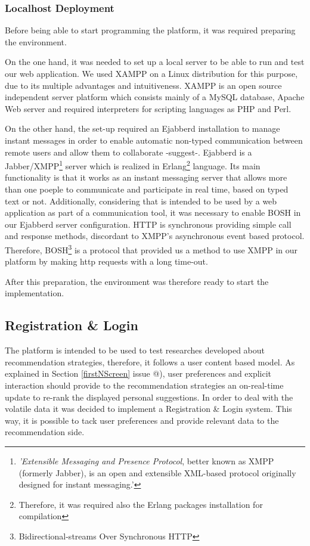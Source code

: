 \documentclass{acm_proc_article-sp}
\makeatletter
\newcommand*{\rom}[1]{\expandafter\@slowromancap\romannumeral #1@}
\makeatother
\begin{document}
\subsubsection{Localhost Deployment}

Before being able to start programming the platform, it was required preparing the environment. 

On the one hand, it was needed to set up a local server to be able to run and test our web application. We used XAMPP on a Linux distribution for this purpose, due to its multiple advantages and intuitiveness. XAMPP is an open source independent server platform which consists mainly of a MySQL database, Apache Web server and required interpreters for scripting languages as PHP and Perl. 

On the other hand, the set-up required an Ejabberd installation to manage instant messages in order to enable automatic non-typed communication between remote users and allow them to collaborate -suggest-. Ejabberd is a Jabber/XMPP\cite{wiki:xmpp}\footnote{\textit{'Extensible Messaging and Presence Protocol}, better known as XMPP (formerly Jabber), is an open and extensible XML-based protocol originally designed for instant messaging.'} server \cite{jia2010xmpp} which is realized in Erlang\footnote{Therefore, it was required also the Erlang packages installation for compilation} language. Its main functionality is that it works as an instant messaging server that allows more than one poeple to communicate and participate in real time, based on typed text or not. Additionally, considering that is intended to be used by a web application as part of a communication tool, it was necessary to enable BOSH in our Ejabberd server configuration. HTTP is synchronous providing simple call and response methods, discordant to XMPP's asynchronous event based protocol. Therefore, BOSH\footnote{Bidirectional-streams Over Synchronous HTTP} is a protocol that provided us a method to use XMPP in our platform by making http requests with a long time-out.

After this preparation, the environment was therefore ready to start the implementation. 
\subsection{Registration \& Login}

The platform is intended to be used to test researches developed about recommendation strategies, therefore, it follows a user content based model. As explained in Section \ref{firstNScreen} issue \rom{1}), user preferences and explicit interaction should provide to the recommendation strategies an on-real-time update to re-rank the displayed personal suggestions. In order to deal with the volatile data it was decided to implement a Registration \& Login system. This way, it is possible to tack user preferences and provide relevant data to the recommendation side. 
\end{document}
